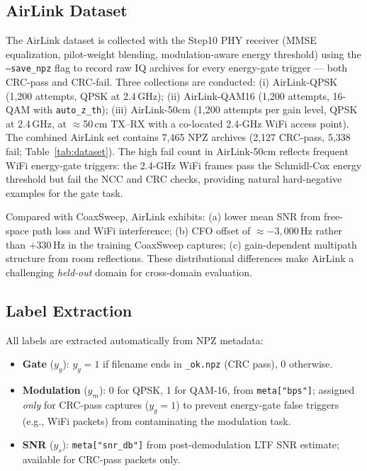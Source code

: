 \documentclass[conference]{IEEEtran}
\begin{document}
\subsection{AirLink Dataset}
\label{sec:ota_data}

The AirLink dataset is collected with the Step10 PHY receiver
(MMSE equalization, pilot-weight blending, modulation-aware energy
threshold) using the \texttt{--save\_npz} flag to record raw IQ
archives for every energy-gate trigger — both CRC-pass and CRC-fail.
Three collections are conducted:
(i) AirLink-QPSK (1{,}200 attempts, QPSK at 2.4\,GHz);
(ii) AirLink-QAM16 (1{,}200 attempts, 16-QAM with \texttt{auto\_z\_th});
(iii) AirLink-50cm (1{,}200 attempts per gain level, QPSK at 2.4\,GHz,
at $\approx$50\,cm TX–RX with a co-located 2.4-GHz WiFi access point).
The combined AirLink set contains 7{,}465 NPZ archives
(2{,}127 CRC-pass, 5{,}338 fail; Table~\ref{tab:dataset}).
The high fail count in AirLink-50cm reflects frequent WiFi energy-gate
triggers: the 2.4-GHz WiFi frames pass the Schmidl-Cox energy threshold
but fail the NCC and CRC checks, providing natural hard-negative
examples for the gate task.

Compared with CoaxSweep, AirLink exhibits: (a) lower mean SNR
from free-space path loss and WiFi interference; (b) CFO
offset of $\approx -3{,}000$\,Hz rather than $+330$\,Hz in the
training CoaxSweep captures; (c) gain-dependent multipath
structure from room reflections.
These distributional differences make AirLink a challenging
\emph{held-out} domain for cross-domain evaluation.

\subsection{Label Extraction}
\label{sec:labels}

All labels are extracted automatically from NPZ metadata:
\begin{itemize}
  \item \textbf{Gate} ($y_g$): $y_g = 1$ if filename ends in
    \texttt{\_ok.npz} (CRC pass), 0 otherwise.
  \item \textbf{Modulation} ($y_m$): 0 for QPSK, 1 for QAM-16,
    from \texttt{meta["bps"]}; assigned \emph{only} for CRC-pass
    captures ($y_g\!=\!1$) to prevent energy-gate false triggers
    (e.g., WiFi packets) from contaminating the modulation task.
  \item \textbf{SNR} ($y_s$): \texttt{meta["snr\_db"]} from
    post-demodulation LTF SNR estimate; available for CRC-pass
    packets only.
\end{itemize}
\end{document}
